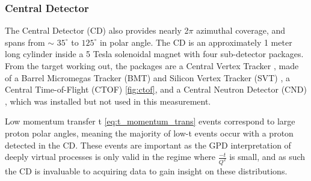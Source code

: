 \subsubsection*{Central Detector}

    The Central Detector (CD) also provides nearly 2$\pi$ azimuthal coverage, and spans from $\sim$ $35^{\circ}$  to $125^{\circ}$ in polar angle. The CD is an approximately 1 meter long cylinder inside a 5 Tesla solenoidal magnet \parencite{Fair2020TheMagnets} with four sub-detector packages. From the target working out, the packages are a Central Vertex Tracker , made of a Barrel Micromegas Tracker (BMT) \parencite{Acker2020TheTracker} and Silicon Vertex Tracker (SVT) \parencite{Antonioli2020TheTracker}, a Central Time-of-Flight (CTOF) \parencite{Carman2020TheSystem} \ref{fig:ctof}, and a Central Neutron Detector (CND) \parencite{Chatagnon2020TheDetector}, which was installed but not used in this measurement. 
    

    Low momentum transfer t \eqref{eq:t_momentum_trans} events correspond to large proton polar angles, meaning the majority of low-t events occur with a proton detected in the CD. These events are important as the GPD interpretation of deeply virtual processes is only valid in the regime where $\frac{-t}{Q^2}$ is small, and as such the CD is invaluable to acquiring data to gain insight on these distributions.        



 
        


